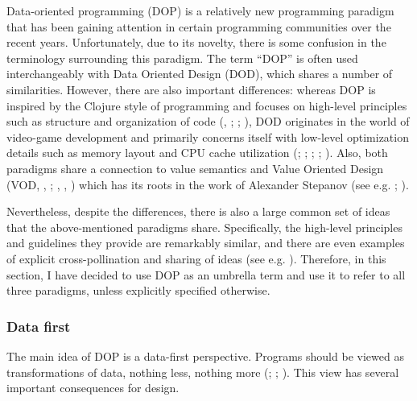 \documentclass[
]{book}
\theoremstyle{definition}
\theoremstyle{definition}
\theoremstyle{definition}
\theoremstyle{definition}
\theoremstyle{remark}
\begin{document}
Data-oriented programming (DOP) is a relatively new programming paradigm that has been gaining attention in certain programming communities over the recent years. Unfortunately, due to its novelty, there is some confusion in the terminology surrounding this paradigm. The term ``DOP'' is often used interchangeably with Data Oriented Design (DOD), which shares a number of similarities. However, there are also important differences: whereas DOP is inspired by the Clojure style of programming and focuses on high-level principles such as structure and organization of code (, ; ; ), DOD originates in the world of video-game development and primarily concerns itself with low-level optimization details such as memory layout and CPU cache utilization (; ; ; ; ). Also, both paradigms share a connection to value semantics and Value Oriented Design (VOD, , ; , , ) which has its roots in the work of Alexander Stepanov (see e.g. ; ).

Nevertheless, despite the differences, there is also a large common set of ideas that the above-mentioned paradigms share. Specifically, the high-level principles and guidelines they provide are remarkably similar, and there are even examples of explicit cross-pollination and sharing of ideas (see e.g. ). Therefore, in this section, I have decided to use DOP as an umbrella term and use it to refer to all three paradigms, unless explicitly specified otherwise.

\subsubsection{Data first}\label{data-first}

The main idea of DOP is a data-first perspective. Programs should be viewed as transformations of data, nothing less, nothing more (; ; ). This view has several important consequences for design.
\end{document}
